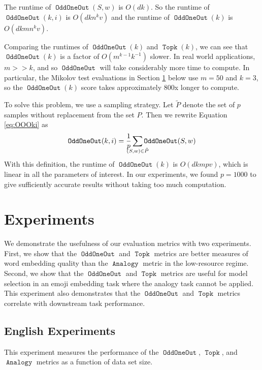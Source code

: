 \documentclass[11pt,a4paper]{article}
\DeclareMathOperator{\OddOneOut}{\texttt{OddOneOut}}
\DeclareMathOperator{\topk}{\texttt{Topk}}
\DeclareMathOperator{\analogy}{\texttt{Analogy}}
\begin{document}
The runtime of $\OddOneOut(S,w)$ is $O(dk)$.
So the runtime of $\OddOneOut(k,i)$ is $O(dkn^kv)$ and the runtime of $\OddOneOut(k)$ is $O(dkmn^kv)$.

Comparing the runtimes of $\OddOneOut(k)$ and $\topk(k)$, we can see that $\OddOneOut(k)$ is a factor of $O(m^{k-1}k^{-1})$ slower.
In real world applications, $m >\!\!> k$, and so $\OddOneOut$ will take considerably more time to compute.
In particular, the Mikolov test evaluations in Section \ref{sec:experiments} below use $m=50$ and $k=3$,
so the $\OddOneOut(k)$ score takes approximately 800x longer to compute.

To solve this problem, we use a sampling strategy.
Let $\tilde P$ denote the set of $p$ samples without replacement from the set $P$.
Then we rewrite Equation \ref{eq:OOOki} as
\begin{equation}
    \OddOneOut(k,i) = \frac 1 p \sum_{\mathclap{(S,w) \in \tilde P}} \OddOneOut(S,w)
\end{equation}
With this definition, the runtime of $\OddOneOut(k)$ is $O(dkmpv)$,
which is linear in all the parameters of interest.
In our experiments, we found $p=1000$ to give sufficiently accurate results without taking too much computation.

\section{Experiments}
\label{sec:experiments}

We demonstrate the usefulness of our evaluation metrics with two experiments.
First, we show that the $\OddOneOut$ and $\topk$ metrics are better measures of word embedding quality than the $\analogy$ metric in the low-resource regime.
Second, we show that the $\OddOneOut$ and $\topk$ metrics are useful for model selection in an emoji embedding task where the analogy task cannot be applied.
This experiment also demonstrates that the $\OddOneOut$ and $\topk$ metrics correlate with downstream task performance.

\subsection{English Experiments}

This experiment measures the performance of the $\OddOneOut$, $\topk$, and $\analogy$ metrics as a function of data set size.

\end{document}
